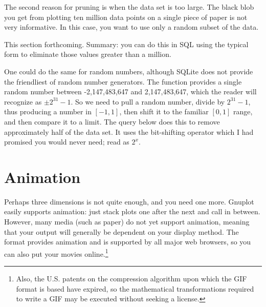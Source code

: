 The second reason for pruning is when the data set is too large. The black
blob you get from plotting ten million data points on a single piece of
paper is not very informative. In this case, you want to use only a
random subset of the data.

This section forthcoming. Summary: you can do this in SQL using the
typical  form to eliminate
those values greater than a million. 

One could do the same for random
numbers, although SQLite does not provide the friendliest of random
number generators. The  function provides a single random
number between -2,147,483,647 and 2,147,483,647, which the reader will
recognize as $\pm 2^{31}-1$. So we need to pull a random number,
divide by $2^{31}-1$, thus producing a number in $[-1,1]$, then shift it
to the familiar $[0,1]$ range, and then compare it to a limit. The
query below does this to remove approximately half of the data set.
It uses the bit-shifting operator which I had promised you would never
need; read  as $2^x$.



\section{Animation} Perhaps three dimensions is not
quite enough, and you need one more. Gnuplot easily supports animation:
just stack plots one after the next and call  in between. However,
many media (such as paper) do not yet support animation, meaning that your
output will generally be dependent on your display method. The  format
provides animation and is supported by all major web browsers, so you
can also put your movies online.\footnote{Also, the U.S. patents on the
compression algorithm upon which the GIF format is based \citep{welch:lzw}
have expired, so the mathematical transformations required to write a
GIF may be executed without seeking a license.}

